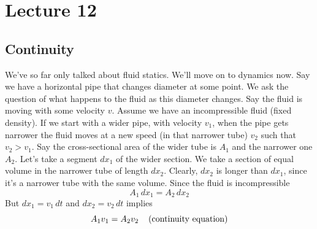 \documentclass{report}
\numberwithin{equation}{section}
\begin{document}
\section{Lecture 12}
\subsection{Continuity}
We've so far only talked about fluid statics. We'll move on to dynamics now. Say we have a horizontal pipe that changes diameter
at some point. We ask the question of what happens to the fluid as this diameter changes. Say the fluid is moving with some velocity $v$.
Assume we have an incompressible fluid (fixed density). If we start with a wider pipe, with velocity $v_1$,
when the pipe gets narrower the fluid moves at a new speed (in that narrower tube) $v_2$ such that $v_2 > v_1$. Say the cross-sectional
area of the wider tube is $A_1$ and the narrower one $A_2$. Let's take a segment $dx_1$ of the wider section. We take
a section of equal volume in the narrower tube of length $dx_2$. Clearly, $dx_2$ is longer than $dx_1$, since it's a narrower
tube with the same volume. Since the fluid is incompressible
\begin{equation}
    A_1\,dx_1 = A_2\,dx_2
\end{equation}
But $dx_1 = v_1\,dt$ and $dx_2 = v_2\,dt$ implies
\begin{equation}
    A_1v_1 = A_2v_2 \hspace{0.4cm}\text{(continuity equation)}
\end{equation}
\end{document}
